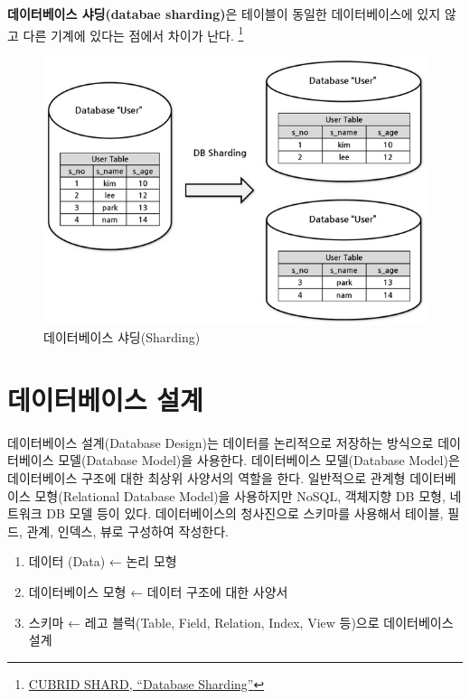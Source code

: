 \documentclass[
  letterpaper,
  chapter,a4paper,showtrims,openright,hidelinks]{oblivoir}
\providecommand{\tightlist}{%
  \setlength{\itemsep}{0pt}\setlength{\parskip}{0pt}}\usepackage{longtable,booktabs,array}
\begin{document}
\textbf{데이터베이스 샤딩(databae sharding)}은 테이블이 동일한
데이터베이스에 있지 않고 다른 기계에 있다는 점에서 차이가 난다.
\footnote{\href{https://www.cubrid.org/manual/ko/9.3.0/shard.html}{CUBRID
  SHARD, ``Database Sharding''}}

\begin{figure}

{\centering \includegraphics{images/database_sharding.png}

}

\caption{데이터베이스 샤딩(Sharding)}

\end{figure}

\hypertarget{db-design}{%
\section{데이터베이스 설계}\label{db-design}}

데이터베이스 설계(Database Design)는 데이터를 논리적으로 저장하는
방식으로 데이터베이스 모델(Database Model)을 사용한다. 데이터베이스
모델(Database Model)은 데이터베이스 구조에 대한 최상위 사양서의 역할을
한다. 일반적으로 관계형 데이터베이스 모형(Relational Database Model)을
사용하지만 NoSQL, 객체지향 DB 모형, 네트워크 DB 모델 등이 있다.
데이터베이스의 청사진으로 스키마를 사용해서 테이블, 필드, 관계, 인덱스,
뷰로 구성하여 작성한다.

\begin{enumerate}
\def\labelenumi{\arabic{enumi}.}
\tightlist
\item
  데이터 (Data) ← 논리 모형
\item
  데이터베이스 모형 ← 데이터 구조에 대한 사양서
\item
  스키마 ← 레고 블럭(Table, Field, Relation, Index, View 등)으로
  데이터베이스 설계
\end{enumerate}
\end{document}
